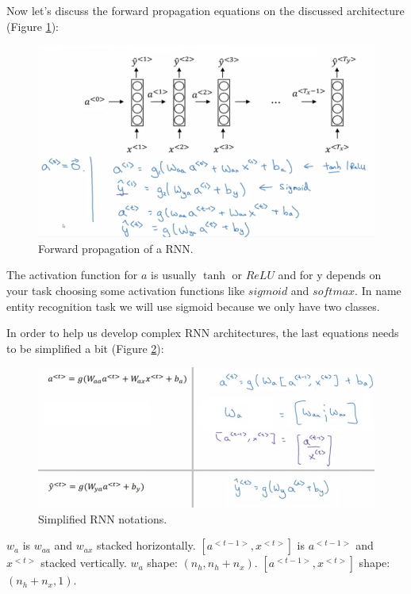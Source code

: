 Now let's discuss the forward propagation equations on the discussed architecture (Figure \ref{forward-nn}):

\begin{figure}[!htbp]
    \centering
    \includegraphics[width=1.0\textwidth]{img/c5/forward-rnn.png}
    \caption{Forward propagation of a RNN.}
    \label{forward-nn}
\end{figure}

The activation function for $a$ is usually $\tanh$ or $ReLU$ and for y depends on your task choosing some activation functions like $sigmoid$ and $softmax$. In name entity recognition task we will use sigmoid because we only have two classes.

In order to help us develop complex RNN architectures, the last equations needs to be simplified a bit (Figure \ref{simple-rnn-notations}):

\begin{figure}[!htbp]
    \centering
    \includegraphics[width=1.0\textwidth]{img/c5/simple-rnn-notations.png}
    \caption{Simplified RNN notations.}
    \label{simple-rnn-notations}
\end{figure}

$w_a$ is $w_{aa}$ and $w_{ax}$ stacked horizontally. $[a^{<t-1>}, x^{<t>}]$ is $a^{<t-1>}$ and $x^{<t>}$ stacked vertically. $w_a$ shape: $(n_h, n_h+n_x)$. $[a^{<t-1>}, x^{<t>}]$ shape: $(n_h + n_x, 1)$.

